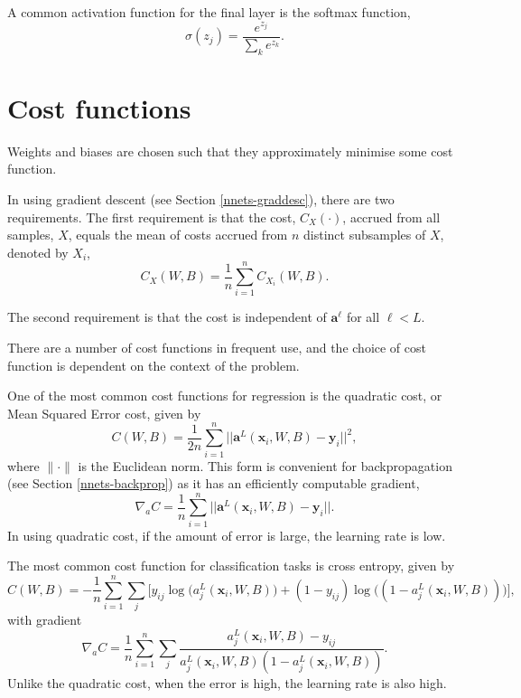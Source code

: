 A common activation function for the final layer is the softmax function,
\[
	\sigma(z_j) = \dfrac{e^{z_j}}{\sum_ke^{z_k}}.
\]

\section{Cost functions}\label{nnets-cost}

Weights and biases are chosen such that they approximately minimise some cost function.

In using gradient descent (see Section \ref{nnets-graddesc}), there are two requirements. The first requirement is that the cost, $C_X(\cdot)$, accrued from all samples, $X$, equals the mean of costs accrued from $n$ distinct subsamples of $X$, denoted by $X_i$,
\[
	C_X(W, B) = \dfrac{1}{n}\sum_{i=1}^n C_{X_i}(W,B).
\]

The second requirement is that the cost is independent of $\mathbf{a}^\ell$ for all $\ell < L$.

There are a number of cost functions in frequent use, and the choice of cost function is dependent on the context of the problem.

One of the most common cost functions for regression is the quadratic cost, or Mean Squared Error cost, given by
\[
	C(W,B) = \dfrac{1}{2n}\sum_{i=1}^n||\mathbf{a}^L(\mathbf{x}_i,W,B) - \mathbf{y}_i ||^2,
\]
where $\|\cdot\|$ is the Euclidean norm. This form is convenient for backpropagation (see Section \ref{nnets-backprop}) as it has an efficiently computable gradient,
\[
	\nabla_aC = \dfrac{1}{n}\sum_{i=1}^n||\mathbf{a}^L(\mathbf{x}_i,W,B) - \mathbf{y}_i ||.
\]
In using quadratic cost, if the amount of error is large, the learning rate is low.

The most common cost function for classification tasks is cross entropy, given by
\[
	C(W,B) = -\dfrac{1}{n}\sum_{i=1}^n\sum_j\big[y_{ij}\log\big(a_j^L(\mathbf{x}_i,W,B)\big) + (1 - y_{ij})\log\big( (1 - a_j^L(\mathbf{x}_i,W,B))\big)\big],
\]
with gradient
\[
	\nabla_aC = \dfrac{1}{n}\sum_{i=1}^n\sum_j\dfrac{a_j^L(\mathbf{x}_i,W,B) - y_{ij}}{a_j^L(\mathbf{x}_i,W,B)(1-a_j^L(\mathbf{x}_i,W,B))}.
\]
Unlike the quadratic cost, when the error is high, the learning rate is also high.


